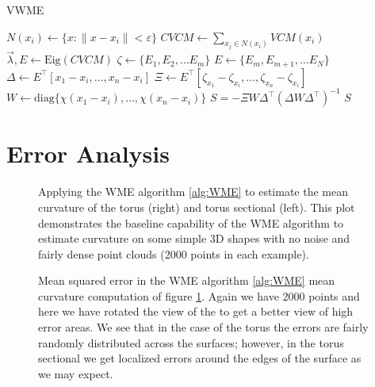 \documentclass{article}
\begin{document}
\begin{algorithm}
\caption{VWME}\label{alg:VWME}
\begin{algorithmic}[1]
\State $N(x_i) \gets \{x : \|x-x_i\| < \varepsilon\}$ 
\State $CVCM \gets \sum_{x_j \in N(x_i)} VCM(x_i)$ 
\State $\vec{\lambda},E \gets \text{Eig}(CVCM)$ 
\State $\zeta \gets \{E_1, E_2, \ldots E_m\}$ 
\State $E \gets \{E_m, E_{m+1}, \ldots E_N\}$ 
\State $\Delta \gets E^\intercal [x_1 - x_i,\ldots,x_n - x_i]$
\State $\Xi \gets E^\intercal [\zeta_{x_1} - \zeta_{x_i}, \ldots, \zeta_{x_n} - \zeta_{x_i}]$
\State $W \gets \text{diag}\{\chi(x_1 - x_i),\ldots,\chi(x_n-x_i)\}$ 
\State $S = -\Xi W \Delta^\intercal (\Delta W \Delta^\intercal)^{-1}$ 
\State \Return $S$
\EndFunction
\end{algorithmic}
\end{algorithm}

\section{Error Analysis}

\begin{figure}

  \centering
    \qquad
    \caption{Applying the WME algorithm \eqref{alg:WME} to estimate the mean curvature of the torus (right) and torus sectional (left). This plot demonstrates the baseline capability of the WME algorithm to estimate curvature on some simple 3D shapes with no noise and fairly dense point clouds (2000 points in each example).}%
\label{fig:toroids_mean_curvature}
\end{figure}

\begin{figure}

  \centering
    \qquad
    \caption{Mean squared error in the WME algorithm \eqref{alg:WME} mean curvature computation of figure \ref{fig:toroids_mean_curvature}. Again we have 2000 points and here we have rotated the view of the to get a better view of high error areas. We see that in the case of the torus the errors are fairly randomly distributed across the surfaces; however, in the torus sectional we get localized errors around the edges of the surface as we may expect. }%
\label{fig:toroids_mean_curvature_error}
\end{figure}
\end{document}
